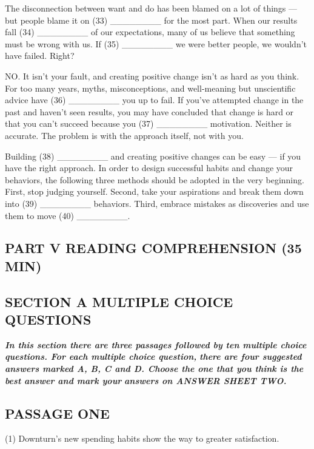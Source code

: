 \documentclass[UTF8,11pt]{ctexart}
\begin{document}
The disconnection between want and do has been blamed on a lot of things — but people blame it on (33) \_\_\_\_\_\_\_\_ for the most part. When our results fall (34) \_\_\_\_\_\_\_\_ of our expectations, many of us believe that something must be wrong with us. If (35) \_\_\_\_\_\_\_\_ we were better people, we wouldn’t have failed. Right?


NO. It isn’t your fault, and creating positive change isn’t as hard as you think. For too many years, myths, misconceptions, and well-meaning but unscientific advice have (36) \_\_\_\_\_\_\_\_ you up to fail. If you’ve attempted change in the past and haven’t seen results, you may have concluded that change is hard or that you can’t succeed because you (37) \_\_\_\_\_\_\_\_ motivation. Neither is accurate. The problem is with the approach itself, not with you.


Building (38) \_\_\_\_\_\_\_\_ and creating positive changes can be easy — if you have the right approach. In order to design successful habits and change your behaviors, the following three methods should be adopted in the very beginning. First, stop judging yourself. Second, take your aspirations and break them down into (39) \_\_\_\_\_\_\_\_ behaviors. Third, embrace mistakes as discoveries and use them to move (40) \_\_\_\_\_\_\_\_.


\subsection*{\textbf{PART V READING COMPREHENSION (35 MIN)}}


\subsection*{\textbf{SECTION A MULTIPLE CHOICE QUESTIONS}}


\textbf{\textit{In this section there are three passages followed by ten multiple choice questions. For each multiple choice question,}} \textbf{\textit{there are four suggested answers marked A, B, C and D. Choose the one that you think is the best answer and mark your}} \textbf{\textit{answers on ANSWER SHEET TWO.}}


\subsection*{\textbf{PASSAGE ONE}}


(1) Downturn’s new spending habits show the way to greater satisfaction.
\end{document}
